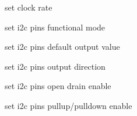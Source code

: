\begin{DoxyItemize}
\item set clock rate ~\newline
~\newline
~\newline
~\newline
~\newline
~\newline
~\newline
~\newline
~\newline

\item set i2c pins functional mode ~\newline
~\newline
~\newline
~\newline
~\newline
~\newline
~\newline
~\newline

\item set i2c pins default output value ~\newline
~\newline
~\newline
~\newline
~\newline
~\newline
~\newline

\item set i2c pins output direction ~\newline
~\newline
~\newline
~\newline
~\newline
~\newline

\item set i2c pins open drain enable ~\newline
~\newline
~\newline
~\newline
~\newline

\item set i2c pins pullup/pulldown enable ~\newline
~\newline
~\newline
~\newline


\end{DoxyItemize}
